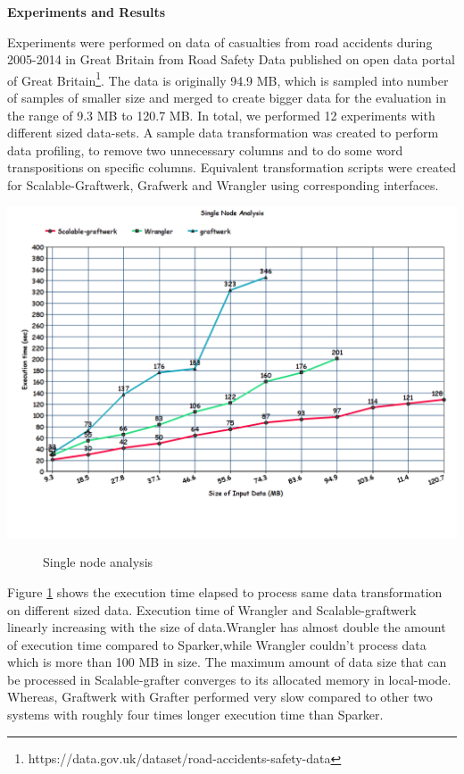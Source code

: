 \textbf{Experiments and Results}

Experiments were performed on data of casualties from road accidents during 2005-2014 in Great Britain from Road Safety Data published on open data portal of Great Britain\footnote{https://data.gov.uk/dataset/road-accidents-safety-data}. The data is originally 94.9 MB, which is sampled into number of samples of smaller size and merged to create bigger data for the evaluation in the range of 9.3 MB to 120.7 MB. In total, we performed 12 experiments with different sized data-sets. A sample data transformation was created to perform data profiling, to remove two unnecessary columns and to do some word transpositions on specific columns. Equivalent transformation scripts were created for Scalable-Graftwerk, Grafwerk and Wrangler using corresponding interfaces. 
\begin{center}
	\includegraphics[width=38em]{./Figures/single-node}
	\begin{figure}[htbp]
    \caption{Single node analysis}
    \label{fig:singlenode}
	\end{figure}
\end{center}
Figure \ref{fig:singlenode} shows the execution time elapsed to process same data transformation on different sized data. Execution time of Wrangler and Scalable-graftwerk linearly increasing with the size of data.Wrangler has almost double the amount of execution time compared to Sparker,while Wrangler couldn't process data which is more than 100 MB in size. The maximum amount of data size that can be processed in Scalable-grafter converges to its allocated memory in local-mode. Whereas, Graftwerk with Grafter performed very slow compared to other two systems with roughly four times longer execution time than Sparker.

